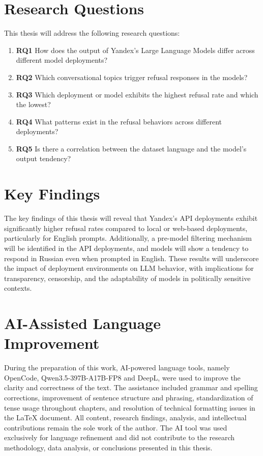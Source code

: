 \section{Research Questions}

This thesis will address the following research questions:

\begin{enumerate}
	\item \textbf{RQ1} How does the output of Yandex's Large Language Models differ across different model deployments?
	\item \textbf{RQ2} Which conversational topics trigger refusal responses in the models?
	\item \textbf{RQ3} Which deployment or model exhibits the highest refusal rate and which the lowest?
	\item \textbf{RQ4} What patterns exist in the refusal behaviors across different deployments?
	\item \textbf{RQ5} Is there a correlation between the dataset language and the model's output tendency?
\end{enumerate}

\section{Key Findings}

The key findings of this thesis will reveal that Yandex's API deployments exhibit significantly higher refusal rates compared to local or web-based deployments, particularly for English prompts. Additionally, a pre-model filtering mechanism will be identified in the API deployments, and models will show a tendency to respond in Russian even when prompted in English. These results will underscore the impact of deployment environments on LLM behavior, with implications for transparency, censorship, and the adaptability of models in politically sensitive contexts.

\section{AI-Assisted Language Improvement}

During the preparation of this work, AI-powered language tools, namely OpenCode, Qwen3.5-397B-A17B-FP8 and DeepL, were used to improve the clarity and correctness of the text. The assistance included grammar and spelling corrections, improvement of sentence structure and phrasing, standardization of tense usage throughout chapters, and resolution of technical formatting issues in the LaTeX document. All content, research findings, analysis, and intellectual contributions remain the sole work of the author. The AI tool was used exclusively for language refinement and did not contribute to the research methodology, data analysis, or conclusions presented in this thesis.

